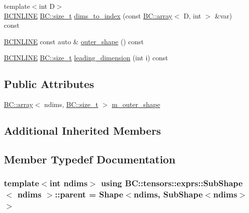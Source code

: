 \begin{DoxyCompactItemize}
\item 
{\footnotesize template$<$int D$>$ }\\\hyperlink{BlackCat__Common_8h_a6699e8b0449da5c0fafb878e59c1d4b1}{B\+C\+I\+N\+L\+I\+NE} \hyperlink{namespaceBC_a6007cbc4eeec401a037b558910a56173}{B\+C\+::size\+\_\+t} \hyperlink{classBC_1_1tensors_1_1exprs_1_1SubShape_a97651ccb78b528caa11314e23480345c}{dims\+\_\+to\+\_\+index} (const \hyperlink{structBC_1_1array}{B\+C\+::array}$<$ D, int $>$ \&var) const 
\item 
\hyperlink{BlackCat__Common_8h_a6699e8b0449da5c0fafb878e59c1d4b1}{B\+C\+I\+N\+L\+I\+NE} const auto \& \hyperlink{classBC_1_1tensors_1_1exprs_1_1SubShape_afabf43689f0bdfb8873b0f9a10b08eb4}{outer\+\_\+shape} () const 
\item 
\hyperlink{BlackCat__Common_8h_a6699e8b0449da5c0fafb878e59c1d4b1}{B\+C\+I\+N\+L\+I\+NE} \hyperlink{namespaceBC_a6007cbc4eeec401a037b558910a56173}{B\+C\+::size\+\_\+t} \hyperlink{classBC_1_1tensors_1_1exprs_1_1SubShape_aa8b80b8dcce133cf11ac69bb631edbc4}{leading\+\_\+dimension} (int i) const 
\end{DoxyCompactItemize}
\subsection*{Public Attributes}
\begin{DoxyCompactItemize}
\item 
\hyperlink{structBC_1_1array}{B\+C\+::array}$<$ ndims, \hyperlink{namespaceBC_a6007cbc4eeec401a037b558910a56173}{B\+C\+::size\+\_\+t} $>$ \hyperlink{classBC_1_1tensors_1_1exprs_1_1SubShape_aecebfe667cd43408f9c94b633b2f3a9d}{m\+\_\+outer\+\_\+shape}
\end{DoxyCompactItemize}
\subsection*{Additional Inherited Members}


\subsection{Member Typedef Documentation}
\subsubsection[{\texorpdfstring{parent}{parent}}]{\setlength{\rightskip}{0pt plus 5cm}template$<$int ndims$>$ using {\bf B\+C\+::tensors\+::exprs\+::\+Sub\+Shape}$<$ ndims $>$\+::{\bf parent} =  {\bf Shape}$<$ndims, {\bf Sub\+Shape}$<$ndims$>$$>$}\hypertarget{classBC_1_1tensors_1_1exprs_1_1SubShape_ad46bda04032a2a649162c80ee78f2a46}{}\label{classBC_1_1tensors_1_1exprs_1_1SubShape_ad46bda04032a2a649162c80ee78f2a46}


